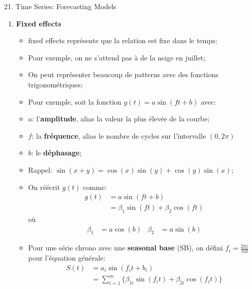 \documentclass[12pt, titlepage, french]{report}
\begin{document}
\begin{CHPT_SUMM}[label = {timeseries21}]{21. Time Series: Forecasting Models}
\begin{enumerate}
\begin{itemize}
		\texttt{[image: src/sine-wave-autocorrelation.png]}
		\item[]	Il y a de l'auto-corrélation cyclique;
		\item[] La 1ère valeur est très semblable à la 24ème, la 12ème à la 36ème, etc. et donc nous allons observer des valeurs très semblables à chaque 24 unité de temps;
		\item[]	De plus, le graphique \textbf{ressemble} évidemment \textbf{à une fonction sinusoïdale};
		\item 	Alors, nous avons un cycle \textbf{saisonnale} pouvant être \textbf{estimé par une fonction sinusoïdale};
		\end{itemize}
%		
	\item[]	\textbf{Fixed effects}
		\begin{itemize}
		\item	\og fixed effects \fg{} représente que la relation est fixe dans le temps;
		\item[]	Pour exemple, on ne s'attend pas à de la neige en juillet;
		\item	On peut représenter beaucoup de patterns avec des fonctions trigonométriques;
		\item	Pour exemple, soit la fonction $g(t) = a \sin (f t + b)$ avec:
		\item[]	$a$: l'\textbf{amplitude}, alias la valeur la plus élevée de la courbe;
		\item[]	$f$: la \textbf{fréquence}, alias le nombre de cycles sur l'intervalle $(0, 2\pi)$
		\item[]	$b$: le \textbf{déphasage};
		\item	Rappel: $\sin(x + y) = \cos(x) \sin(y) + \cos(y) \sin(x)$;
		\item	On réécrit $g(t)$ comme:
		\begin{align*}
			g(t)
				&=	a \sin (f t + b)	\\
				&=	\beta_{1} \sin(ft) + \beta_{2} \cos(ft)	
		\end{align*}
		où
		\begin{align*}
			\beta_{1}	
				&=	a \cos (b)	&
			\beta_{2}	
				&=	a \sin (b)	
		\end{align*}
		\item	Pour une série chrono avec une \textbf{seasonal base} (SB), on défini $f_{i} = \frac{2\pi i}{SB}$ pour l'équation générale:
		\begin{align*}
			S(t)
				&=	a_{i	} \sin (f_{i} t + b_{i})	\\
				&=	\sum_{i = 1}^{m} \{ \beta_{1i} \sin(f_{i}t) + \beta_{2i} \cos(f_{i}t)	 \} 

\end{align*}
\end{itemize}
\end{enumerate}
\end{CHPT_SUMM}
\end{document}
